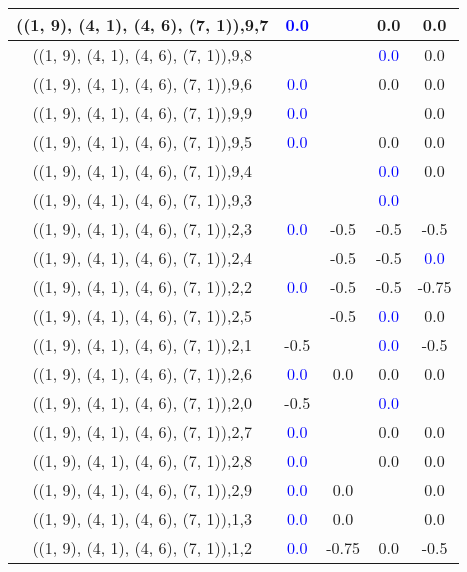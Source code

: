 \documentclass{article}
\begin{document}
\begin{center}
\begin{longtable}{|c|c|c|c|c|}
        	\hline
        	((1, 9), (4, 1), (4, 6), (7, 1)),9,7& \textcolor{blue}{0.0}&&0.0&0.0\\
        	\hline
        	((1, 9), (4, 1), (4, 6), (7, 1)),9,8&&& \textcolor{blue}{0.0}&0.0\\
        	\hline
        	((1, 9), (4, 1), (4, 6), (7, 1)),9,6& \textcolor{blue}{0.0}&&0.0&0.0\\
        	\hline
        	((1, 9), (4, 1), (4, 6), (7, 1)),9,9& \textcolor{blue}{0.0}&&&0.0\\
        	\hline
        	((1, 9), (4, 1), (4, 6), (7, 1)),9,5& \textcolor{blue}{0.0}&&0.0&0.0\\
        	\hline
        	((1, 9), (4, 1), (4, 6), (7, 1)),9,4&&& \textcolor{blue}{0.0}&0.0\\
        	\hline
        	((1, 9), (4, 1), (4, 6), (7, 1)),9,3&&& \textcolor{blue}{0.0}&\\
        	\hline
        	((1, 9), (4, 1), (4, 6), (7, 1)),2,3& \textcolor{blue}{0.0}&-0.5&-0.5&-0.5\\
        	\hline
        	((1, 9), (4, 1), (4, 6), (7, 1)),2,4&&-0.5&-0.5& \textcolor{blue}{0.0}\\
        	\hline
        	((1, 9), (4, 1), (4, 6), (7, 1)),2,2& \textcolor{blue}{0.0}&-0.5&-0.5&-0.75\\
        	\hline
        	((1, 9), (4, 1), (4, 6), (7, 1)),2,5&&-0.5& \textcolor{blue}{0.0}&0.0\\
        	\hline
        	((1, 9), (4, 1), (4, 6), (7, 1)),2,1&-0.5&& \textcolor{blue}{0.0}&-0.5\\
        	\hline
        	((1, 9), (4, 1), (4, 6), (7, 1)),2,6& \textcolor{blue}{0.0}&0.0&0.0&0.0\\
        	\hline
        	((1, 9), (4, 1), (4, 6), (7, 1)),2,0&-0.5&& \textcolor{blue}{0.0}&\\
        	\hline
        	((1, 9), (4, 1), (4, 6), (7, 1)),2,7& \textcolor{blue}{0.0}&&0.0&0.0\\
        	\hline
        	((1, 9), (4, 1), (4, 6), (7, 1)),2,8& \textcolor{blue}{0.0}&&0.0&0.0\\
        	\hline
        	((1, 9), (4, 1), (4, 6), (7, 1)),2,9& \textcolor{blue}{0.0}&0.0&&0.0\\
        	\hline
        	((1, 9), (4, 1), (4, 6), (7, 1)),1,3& \textcolor{blue}{0.0}&0.0&&0.0\\
        	\hline
        	((1, 9), (4, 1), (4, 6), (7, 1)),1,2& \textcolor{blue}{0.0}&-0.75&0.0&-0.5\\
        	\hline

\end{longtable}
\end{center}
\end{document}
